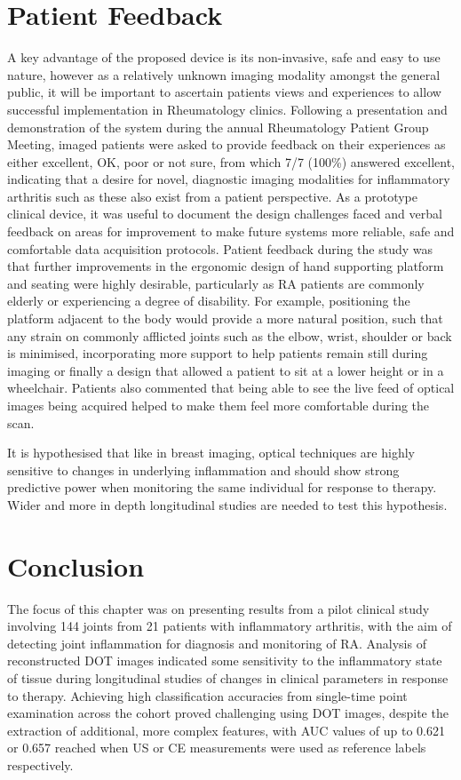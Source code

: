 \documentclass[twoside]{bhamthesis}
\theoremstyle{definition}
\begin{document}
\section{Patient Feedback}

A key advantage of the proposed device is its non-invasive, safe and easy to use nature, however as a relatively unknown imaging modality amongst the general public, it will be important to ascertain patients views and experiences to allow successful implementation in Rheumatology clinics. Following a presentation and demonstration of the system during the annual Rheumatology Patient Group Meeting, imaged patients were asked to provide feedback on their experiences as either excellent, OK, poor or not sure, from which 7/7 (100\%) answered excellent, indicating that a desire for novel, diagnostic imaging modalities for inflammatory arthritis such as these also exist from a patient perspective. As a prototype clinical device, it was useful to document the design challenges faced and verbal feedback on areas for improvement to make future systems more reliable, safe and comfortable data acquisition protocols. Patient feedback during the study was that further improvements in the ergonomic design of hand supporting platform and seating were highly desirable, particularly as RA patients are commonly elderly or experiencing a degree of disability. For example, positioning the platform adjacent to the body would provide a more natural position, such that any strain on commonly afflicted joints such as the elbow, wrist, shoulder or back is minimised, incorporating more support to help patients remain still during imaging or finally a design that allowed a patient to sit at a lower height or in a wheelchair. Patients also commented that being able to see the live feed of optical images being acquired helped to make them feel more comfortable during the scan.

It is hypothesised that like in breast imaging, optical techniques are highly sensitive to changes in underlying inflammation and should show strong predictive power when monitoring the same individual for response to therapy. Wider and more in depth longitudinal studies are needed to test this hypothesis.

\section{Conclusion}

The focus of this chapter was on presenting results from a pilot clinical study involving 144 joints from 21 patients with inflammatory arthritis, with the aim of detecting joint inflammation for diagnosis and monitoring of RA. Analysis of reconstructed DOT images indicated some sensitivity to the inflammatory state of tissue during longitudinal studies of changes in clinical parameters in response to therapy. Achieving high classification accuracies from single-time point examination across the cohort proved challenging using DOT images, despite the extraction of additional, more complex features, with AUC values of up to 0.621 or 0.657 reached when US or CE measurements were used as reference labels respectively. 
\end{document}
